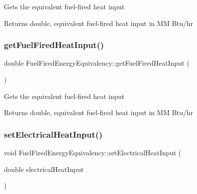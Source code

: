 Gets the equivalent fuel-\/fired heat input \begin{DoxyReturn}{Returns}
double, equivalent fuel-\/fired heat input in MM Btu/hr 
\end{DoxyReturn}
\mbox{\label{class_fuel_fired_energy_equivalency_a6bf68595ca361dd4135d0c84c2fbe6d9}} 
\subsubsection{\texorpdfstring{get\+Fuel\+Fired\+Heat\+Input()}{getFuelFiredHeatInput()}\hspace{0.1cm}{\footnotesize\ttfamily [3/3]}}
{\footnotesize\ttfamily double Fuel\+Fired\+Energy\+Equivalency\+::get\+Fuel\+Fired\+Heat\+Input (\begin{DoxyParamCaption}{ }\end{DoxyParamCaption})}

Gets the equivalent fuel-\/fired heat input \begin{DoxyReturn}{Returns}
double, equivalent fuel-\/fired heat input in MM Btu/hr 
\end{DoxyReturn}
\mbox{\label{class_fuel_fired_energy_equivalency_a222836bfef1cb0caec0adafc2ef6b7ea}} 
\subsubsection{\texorpdfstring{set\+Electrical\+Heat\+Input()}{setElectricalHeatInput()}\hspace{0.1cm}{\footnotesize\ttfamily [1/3]}}
{\footnotesize\ttfamily void Fuel\+Fired\+Energy\+Equivalency\+::set\+Electrical\+Heat\+Input (\begin{DoxyParamCaption}\item[{double}]{electrical\+Heat\+Input }\end{DoxyParamCaption})\hspace{0.3cm}{\ttfamily [inline]}}

